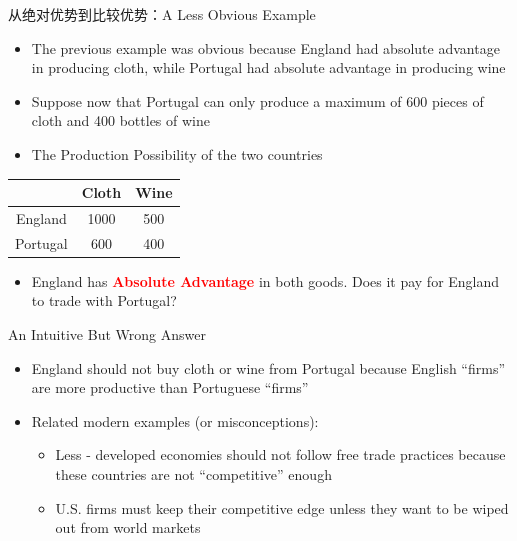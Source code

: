 \documentclass[10pt,hyperref={CJKbookmarks=true},xcolor=dvipsnames,aspectratio=169]{beamer}
\begin{document}
\begin{frame}{从绝对优势到比较优势：A Less Obvious Example}

\begin{itemize}
\item The previous example was obvious because England had absolute advantage
in producing cloth, while Portugal had absolute advantage in producing
wine 
\item Suppose now that Portugal can only produce a maximum of 600 pieces
of cloth and 400 bottles of wine 
\item The Production Possibility of the two countries
\end{itemize}

\begin{center}
\begin{tabular}{|c|c|c|}
\hline 
& Cloth & Wine\tabularnewline
\hline 
\hline 
England & 1000 & 500\tabularnewline
\hline 
Portugal & 600 & 400\tabularnewline
\hline 
\end{tabular}
\par\end{center}
\begin{itemize}
\item England has \textbf{\textcolor{red}{Absolute Advantage}} in both goods.
Does it pay for England to trade with Portugal? 
\end{itemize}
\end{frame}

\begin{frame}{An Intuitive But Wrong Answer }

\begin{itemize}
\item England should not buy cloth or wine from Portugal because English
“firms” are more productive than Portuguese “firms” 
\item Related modern examples (or misconceptions): 

\begin{itemize}
\item Less - developed economies should not follow free trade practices
because these countries are not “competitive” enough 
\item U.S. firms must keep their competitive edge unless they want to be
wiped out from world markets
\end{itemize}
\end{itemize}
\end{frame}
\end{document}
